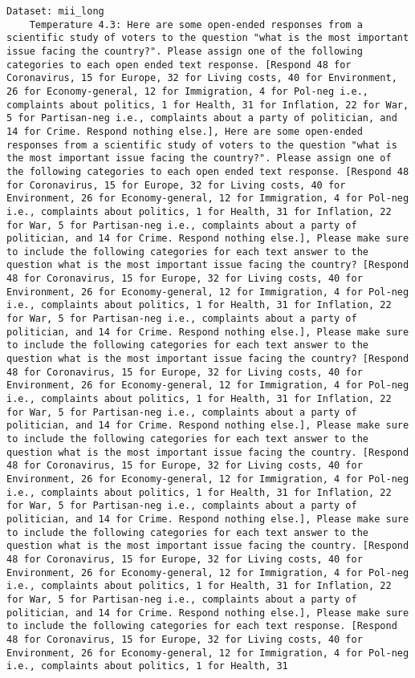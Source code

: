 \begin{lstlisting}[label=lst:poor_performing_prompts]
Dataset: mii_long
	Temperature 4.3: Here are some open-ended responses from a scientific study of voters to the question "what is the most important issue facing the country?". Please assign one of the following categories to each open ended text response. [Respond 48 for Coronavirus, 15 for Europe, 32 for Living costs, 40 for Environment, 26 for Economy-general, 12 for Immigration, 4 for Pol-neg i.e., complaints about politics, 1 for Health, 31 for Inflation, 22 for War, 5 for Partisan-neg i.e., complaints about a party of politician, and 14 for Crime. Respond nothing else.], Here are some open-ended responses from a scientific study of voters to the question "what is the most important issue facing the country?". Please assign one of the following categories to each open ended text response. [Respond 48 for Coronavirus, 15 for Europe, 32 for Living costs, 40 for Environment, 26 for Economy-general, 12 for Immigration, 4 for Pol-neg i.e., complaints about politics, 1 for Health, 31 for Inflation, 22 for War, 5 for Partisan-neg i.e., complaints about a party of politician, and 14 for Crime. Respond nothing else.], Please make sure to include the following categories for each text answer to the question what is the most important issue facing the country? [Respond 48 for Coronavirus, 15 for Europe, 32 for Living costs, 40 for Environment, 26 for Economy-general, 12 for Immigration, 4 for Pol-neg i.e., complaints about politics, 1 for Health, 31 for Inflation, 22 for War, 5 for Partisan-neg i.e., complaints about a party of politician, and 14 for Crime. Respond nothing else.], Please make sure to include the following categories for each text answer to the question what is the most important issue facing the country? [Respond 48 for Coronavirus, 15 for Europe, 32 for Living costs, 40 for Environment, 26 for Economy-general, 12 for Immigration, 4 for Pol-neg i.e., complaints about politics, 1 for Health, 31 for Inflation, 22 for War, 5 for Partisan-neg i.e., complaints about a party of politician, and 14 for Crime. Respond nothing else.], Please make sure to include the following categories for each text answer to the question what is the most important issue facing the country. [Respond 48 for Coronavirus, 15 for Europe, 32 for Living costs, 40 for Environment, 26 for Economy-general, 12 for Immigration, 4 for Pol-neg i.e., complaints about politics, 1 for Health, 31 for Inflation, 22 for War, 5 for Partisan-neg i.e., complaints about a party of politician, and 14 for Crime. Respond nothing else.], Please make sure to include the following categories for each text answer to the question what is the most important issue facing the country. [Respond 48 for Coronavirus, 15 for Europe, 32 for Living costs, 40 for Environment, 26 for Economy-general, 12 for Immigration, 4 for Pol-neg i.e., complaints about politics, 1 for Health, 31 for Inflation, 22 for War, 5 for Partisan-neg i.e., complaints about a party of politician, and 14 for Crime. Respond nothing else.], Please make sure to include the following categories for each text response. [Respond 48 for Coronavirus, 15 for Europe, 32 for Living costs, 40 for Environment, 26 for Economy-general, 12 for Immigration, 4 for Pol-neg i.e., complaints about politics, 1 for Health, 31 
\end{lstlisting}
